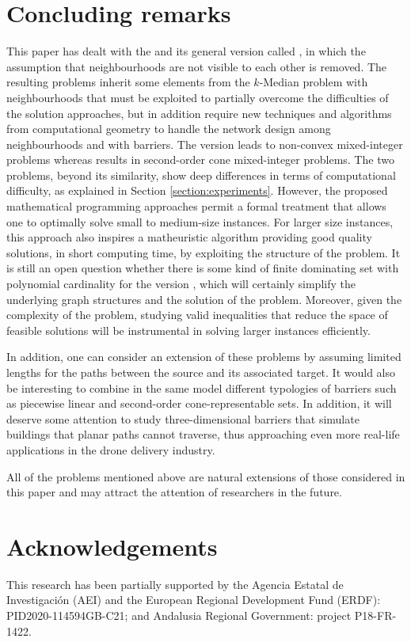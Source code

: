 \documentclass[a4paper,  review, authoryear, 1p.]{elsarticle}
\newcommand{\KMPHN}{{\sf{H-KMPHN}}}
\newcommand{\KMPN}{{\sf{H-KMPN}\xspace }}
\begin{document}
		
		\section{Concluding remarks}\label{section:conclusion}
		This paper has dealt with the \KMPHN \xspace and its general version called \KMPN, in which the assumption that neighbourhoods are not visible to each other is removed. The resulting problems inherit some elements from the $k$-Median problem with neighbourhoods that must be exploited to partially overcome the difficulties of the solution approaches, but in addition require new techniques and algorithms  from computational geometry to handle the network design among neighbourhoods and with barriers. The \KMPN \xspace version leads to  non-convex mixed-integer problems whereas \KMPHN \xspace results in second-order cone mixed-integer problems. The two problems, beyond its similarity, show deep differences in terms of computational difficulty, as explained in Section \ref{section:experiments}. However, the proposed mathematical programming approaches permit a formal treatment that allows one to optimally solve small to medium-size instances. For larger size instances, this approach also inspires a matheuristic algorithm providing good quality solutions, in short computing time, by exploiting the structure of the problem. It is still an open question whether there is some kind of finite dominating set with polynomial cardinality for the version \KMPHN, which will certainly simplify the underlying graph structures and the solution of the problem. Moreover, given the complexity of the problem, studying valid inequalities that reduce the space of feasible solutions will be instrumental in solving larger instances efficiently. 
		
		In addition, one can consider an extension of these problems by assuming limited lengths for the paths between the source and its associated target. It would also be interesting to combine in the same model different typologies of barriers such as piecewise linear and second-order cone-representable sets. In addition, it will deserve some attention to study three-dimensional barriers that simulate buildings that planar paths cannot traverse, thus approaching even more real-life applications in the drone delivery industry. 
		
		All of the problems mentioned above are natural extensions of those considered in this paper and may attract the attention of researchers in the future.
		
		\section*{Acknowledgements}
		This research has been partially supported by the Agencia Estatal de Investigación (AEI) and the European Regional Development Fund (ERDF): PID2020-114594GB-C21; and Andalusia Regional Government: project P18-FR-1422.
		
		
		
		
		
		
		
	
		
		
		
		
		
		
		
		
		
		
		
		
		
		
		
		
		

	
\end{document}
